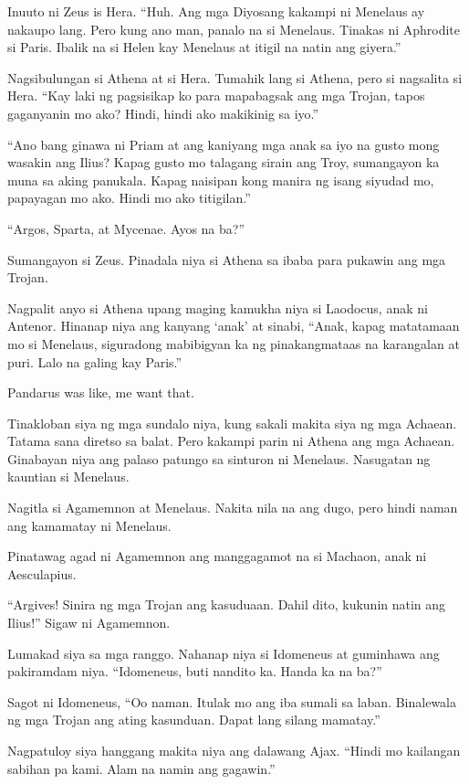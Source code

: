 \documentclass[12pt,letterpaper]{report}
\begin{document}
Inuuto ni Zeus is Hera. ``Huh. Ang mga Diyosang kakampi ni Menelaus ay nakaupo lang. Pero kung ano man, panalo na si Menelaus. Tinakas ni Aphrodite si Paris. Ibalik na si Helen kay Menelaus at itigil na natin ang giyera.''

Nagsibulungan si Athena at si Hera. Tumahik lang si Athena, pero si nagsalita si Hera. ``Kay laki ng pagsisikap ko para mapabagsak ang mga Trojan, tapos gaganyanin mo ako? Hindi, hindi ako makikinig sa iyo.''

``Ano bang ginawa ni Priam at ang kaniyang mga anak sa iyo na gusto mong wasakin ang Ilius? Kapag gusto mo talagang sirain ang Troy, sumangayon ka muna sa aking panukala. Kapag naisipan kong manira ng isang siyudad mo, papayagan mo ako. Hindi mo ako titigilan.''

``Argos, Sparta, at Mycenae. Ayos na ba?''

Sumangayon si Zeus. Pinadala niya si Athena sa ibaba para pukawin ang mga Trojan.

Nagpalit anyo si Athena upang maging kamukha niya si Laodocus, anak ni Antenor. Hinanap niya ang kanyang `anak' at sinabi, ``Anak, kapag matatamaan mo si Menelaus, siguradong mabibigyan ka ng pinakangmataas na karangalan at puri. Lalo na galing kay Paris.''

Pandarus was like, me want that.

Tinakloban siya ng mga sundalo niya, kung sakali makita siya ng mga Achaean. Tatama sana diretso sa balat. Pero kakampi parin ni Athena ang mga Achaean. Ginabayan niya ang palaso patungo sa sinturon ni Menelaus. Nasugatan ng kauntian si Menelaus.

Nagitla si Agamemnon at Menelaus. Nakita nila na ang dugo, pero hindi naman ang kamamatay ni Menelaus.

Pinatawag agad ni Agamemnon ang manggagamot na si Machaon, anak ni Aesculapius.

``Argives! Sinira ng mga Trojan ang kasuduaan. Dahil dito, kukunin natin ang Ilius!'' Sigaw ni Agamemnon.

Lumakad siya sa mga ranggo. Nahanap niya si Idomeneus at guminhawa ang pakiramdam niya. ``Idomeneus, buti nandito ka. Handa ka na ba?''

Sagot ni Idomeneus, ``Oo naman. Itulak mo ang iba sumali sa laban. Binalewala ng mga Trojan ang ating kasunduan. Dapat lang silang mamatay.''

Nagpatuloy siya hanggang makita niya ang dalawang Ajax. ``Hindi mo kailangan sabihan pa kami. Alam na namin ang gagawin.''
\end{document}
